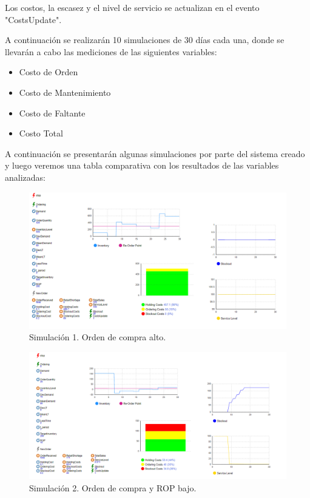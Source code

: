     Los costos, la escasez y el nivel de servicio se actualizan en el evento "CostsUpdate".

    A continuación se realizarán 10 simulaciones de 30 días cada una, donde se llevarán a cabo las mediciones de las siguientes variables:
    \begin{itemize}
        \item Costo de Orden
        \item Costo de Mantenimiento
        \item Costo de Faltante
        \item Costo Total
    \end{itemize}

    A continuación se presentarán algunas simulaciones por parte del sistema creado y luego veremos una tabla comparativa con los resultados de las variables analizadas:
    \begin{figure}[H]
        \includegraphics[width=\linewidth]{images/img1invent}
        \caption{Simulación 1. Orden de compra alto.}
    \end{figure}

    \begin{figure}[H]
        \includegraphics[width=\linewidth]{images/img2invent}
        \caption{Simulación 2. Orden de compra y ROP bajo.}
    \end{figure}

